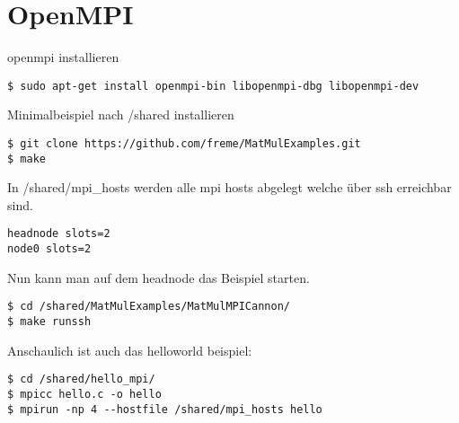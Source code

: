 \chapter{OpenMPI}
openmpi installieren
\begin{lstlisting}[style=Bash]
$ sudo apt-get install openmpi-bin libopenmpi-dbg libopenmpi-dev
\end{lstlisting}
Minimalbeispiel nach /shared installieren
\begin{lstlisting}[style=Bash]
$ git clone https://github.com/freme/MatMulExamples.git
$ make
\end{lstlisting}
In /shared/mpi\_hosts werden alle mpi hosts abgelegt welche über ssh erreichbar sind.
\begin{lstlisting}[style=Bash]
headnode slots=2
node0 slots=2
\end{lstlisting}
Nun kann man auf dem headnode das Beispiel starten.
\begin{lstlisting}[style=Bash]
$ cd /shared/MatMulExamples/MatMulMPICannon/
$ make runssh
\end{lstlisting}
Anschaulich ist auch das helloworld beispiel:
\begin{lstlisting}[style=Bash]
$ cd /shared/hello_mpi/
$ mpicc hello.c -o hello 
$ mpirun -np 4 --hostfile /shared/mpi_hosts hello
\end{lstlisting}
